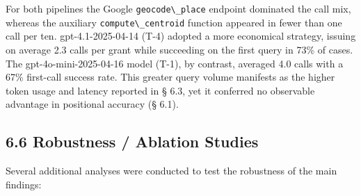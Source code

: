 \documentclass[
  10pt]{article}
\providecommand{\passthrough}[1]{#1}
\begin{document}
For both pipelines the Google \passthrough{\lstinline!geocode\_place!}
endpoint dominated the call mix, whereas the auxiliary
\passthrough{\lstinline!compute\_centroid!} function appeared in fewer
than one call per ten. gpt-4.1-2025-04-14 (T-4) adopted a more
economical strategy, issuing on average 2.3 calls per grant while
succeeding on the first query in 73\% of cases. The
gpt-4o-mini-2025-04-16 model (T-1), by contrast, averaged 4.0 calls with
a 67\% first-call success rate. This greater query volume manifests as
the higher token usage and latency reported in § 6.3, yet it conferred
no observable advantage in positional accuracy (§ 6.1).

\subsection{6.6 Robustness / Ablation
Studies}\label{robustness-ablation-studies}

Several additional analyses were conducted to test the robustness of the
main findings:
\end{document}
